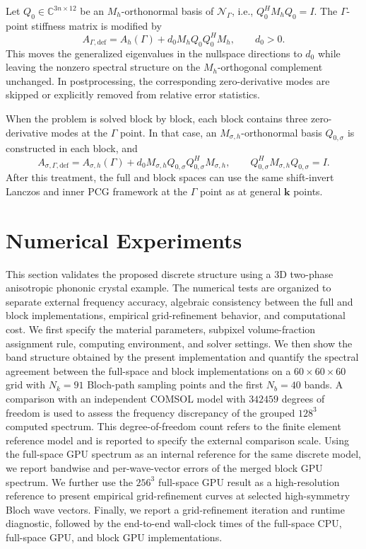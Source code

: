\documentclass[11pt,oneside]{article}
\numberwithin{equation}{section}
\theoremstyle{plain}
\theoremstyle{remark}
\newcommand{\bk}{\bm{k}}
\begin{document}
Let \(Q_0\in\mathbb C^{3n\times12}\) be an \(M_h\)-orthonormal basis of \(\mathcal N_\Gamma\), i.e., \(Q_0^HM_hQ_0=I\). The \(\Gamma\)-point stiffness matrix is modified by
\begin{equation}\label{eq:gamma_deflation_full_main}
A_{\Gamma,\mathrm{def}}
=
A_h(\Gamma)+d_0M_hQ_0Q_0^HM_h,
\qquad d_0>0.
\end{equation}
This moves the generalized eigenvalues in the nullspace directions to \(d_0\) while leaving the nonzero spectral structure on the \(M_h\)-orthogonal complement unchanged. In postprocessing, the corresponding zero-derivative modes are skipped or explicitly removed from relative error statistics.

When the problem is solved block by block, each block contains three zero-derivative modes at the \(\Gamma\) point. In that case, an \(M_{\sigma,h}\)-orthonormal basis \(Q_{0,\sigma}\) is constructed in each block, and
\begin{equation}\label{eq:gamma_deflation_sector_main}
A_{\sigma,\Gamma,\mathrm{def}}
=
A_{\sigma,h}(\Gamma)+d_0M_{\sigma,h}Q_{0,\sigma}Q_{0,\sigma}^HM_{\sigma,h},
\qquad
Q_{0,\sigma}^HM_{\sigma,h}Q_{0,\sigma}=I.
\end{equation}
After this treatment, the full and block spaces can use the same shift-invert Lanczos and inner PCG framework at the \(\Gamma\) point as at general \(\bk\) points.

\section{Numerical Experiments}
\label{sec:num}

This section validates the proposed discrete structure using a 3D two-phase anisotropic phononic crystal example. The numerical tests are organized to separate external frequency accuracy, algebraic consistency between the full and block implementations, empirical grid-refinement behavior, and computational cost. We first specify the material parameters, subpixel volume-fraction assignment rule, computing environment, and solver settings. We then show the band structure obtained by the present implementation and quantify the spectral agreement between the full-space and block implementations on a \(60\times60\times60\) grid with \(N_k=91\) Bloch-path sampling points and the first \(N_b=40\) bands. A comparison with an independent COMSOL model with \(342459\) degrees of freedom is used to assess the frequency discrepancy of the grouped \(128^3\) computed spectrum. This degree-of-freedom count refers to the finite element reference model and is reported to specify the external comparison scale. Using the full-space GPU spectrum as an internal reference for the same discrete model, we report bandwise and per-wave-vector errors of the merged block GPU spectrum. We further use the \(256^3\) full-space GPU result as a high-resolution reference to present empirical grid-refinement curves at selected high-symmetry Bloch wave vectors. Finally, we report a grid-refinement iteration and runtime diagnostic, followed by the end-to-end wall-clock times of the full-space CPU, full-space GPU, and block GPU implementations.
\end{document}
